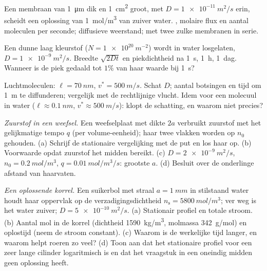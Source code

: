 \begin{exercise}[$\star$]\label{exo:b2:particle-diffusion:2}
Een membraan van \qty{1}{\micro m} dik en \qty{1}{cm^2} groot, met
$D =
\qty{1e-11}{m^2/s}$ erin, scheidt een oplossing van \qty{1}{mol/m^3}
van zuiver water. , molaire flux en aantal moleculen
per seconde; diffusieve weerstand; met twee zulke membranen in serie.
\end{exercise}

\begin{exercise}[$\star$]\label{exo:b2:particle-diffusion:3}
Een dunne laag kleurstof ($N = \qty{1e20}{m^{-2}}$) wordt in water losgelaten,
$D = \qty{1e-9}{m^2/s}$. Breedte $\sqrt{2Dt}$ en piekdichtheid na
\qty{1}{s}, \qty{1}{h}, \qty{1}{dag}. Wanneer is de piek gedaald tot
$1\%$ van haar waarde bij \qty{1}{s}?
\end{exercise}

\begin{exercise}[$\star$]\label{exo:b2:particle-diffusion:4}
Luchtmoleculen: $\ell = \qty{70}{nm}$, $v^* = \qty{500}{m/s}$. Schat
$D$; aantal botsingen en tijd om \qty{1}{m} te diffunderen; vergelijk met
de rechtlijnige vlucht. Idem voor een molecuul in water
($\ell \approx
\qty{0.1}{nm}$, $v^* \approx \qty{500}{m/s}$): klopt de
schatting, en
waarom niet precies?
\end{exercise}

\begin{exercise}[$\star\star$]\label{exo:b2:particle-diffusion:5}
\emph{Zuurstof in een weefsel.} Een weefselplaat met dikte $2a$ verbruikt
zuurstof met het gelijkmatige tempo $q$ (per volume-eenheid); haar twee
vlakken worden
op $n_0$ gehouden. (a) Schrijf de stationaire vergelijking met de put en los
haar op. (b) Voorwaarde opdat zuurstof het midden bereikt. (c)
$D = \qty{2e-9}{m^2/s}$,
$n_0 = \qty{0.2}{mol/m^3}$, $q = \qty{0.01}{mol/m^3/s}$: grootste $a$. (d)
Besluit over de onderlinge afstand van haarvaten.
\end{exercise}

\begin{exercise}[$\star\star$]\label{exo:b2:particle-diffusion:6}
\emph{Een oplossende korrel.} Een suikerbol met straal $a = \qty{1}{mm}$
in stilstaand water houdt haar oppervlak op de verzadigingsdichtheid
$n_{\text{s}}
= \qty{5800}{mol/m^3}$; ver weg is het water zuiver;
$D =
\qty{5e-10}{m^2/s}$. (a) Stationair profiel en totale stroom. (b)
Aantal mol in de korrel (dichtheid \qty{1590}{kg/m^3}, molmassa
\qty{342}{g/mol}) en oplostijd (neem de stroom constant).
(c) Waarom is de werkelijke tijd langer, en waarom helpt roeren zo veel?
(d) Toon aan dat het stationaire profiel voor een zeer lange cilinder
logaritmisch is en dat het vraagstuk in een oneindig midden geen oplossing heeft.
\end{exercise}

